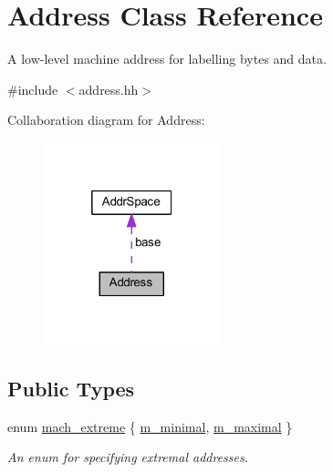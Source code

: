 \hypertarget{class_address}{}\section{Address Class Reference}
\label{class_address}


A low-\/level machine address for labelling bytes and data.  




{\ttfamily \#include $<$address.\+hh$>$}



Collaboration diagram for Address\+:
\nopagebreak
\begin{figure}[H]
\begin{center}
\leavevmode
\includegraphics[width=145pt]{class_address__coll__graph}
\end{center}
\end{figure}
\subsection*{Public Types}
\begin{DoxyCompactItemize}
\item 
enum \mbox{\hyperlink{class_address_ab6dfc48b4779dab420c4ae0bc5aaffd7}{mach\+\_\+extreme}} \{ \mbox{\hyperlink{class_address_ab6dfc48b4779dab420c4ae0bc5aaffd7a1990ccfacf791a707a42d623bdc4134d}{m\+\_\+minimal}}, 
\mbox{\hyperlink{class_address_ab6dfc48b4779dab420c4ae0bc5aaffd7abe15025551d5d35578ab1f409e3f6b7f}{m\+\_\+maximal}}
 \}
\begin{DoxyCompactList}\small\item\em An enum for specifying extremal addresses. \end{DoxyCompactList}\end{DoxyCompactItemize}
